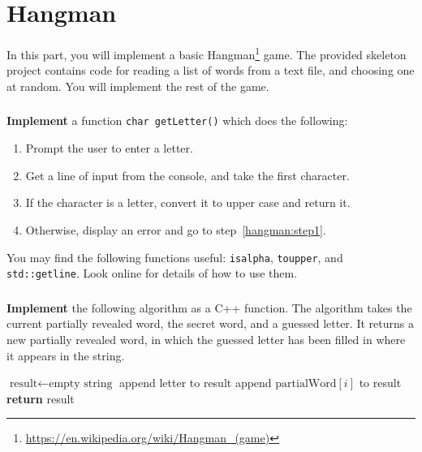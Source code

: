 \documentclass{scrartcl}
\begin{document}
\clearpage
\part{Hangman}

In this part, you will implement a basic Hangman\footnote{\url{https://en.wikipedia.org/wiki/Hangman_(game)}} game.
The provided skeleton project contains code for reading a list of words from a text file, and choosing one at random.
You will implement the rest of the game.

\section{} \label{core-a-first}

\textbf{Implement} a function \lstinline{char getLetter()} which does the following:
\begin{enumerate}
\item \label{hangman:step1} Prompt the user to enter a letter.
\item Get a line of input from the console, and take the first character.
\item If the character is a letter, convert it to upper case and return it.
\item Otherwise, display an error and go to step~\ref{hangman:step1}.
\end{enumerate}

You may find the following functions useful: \lstinline{isalpha}, \lstinline{toupper}, and \lstinline{std::getline}.
Look online for details of how to use them.

\section{}

\textbf{Implement} the following algorithm as a C++ function.
The algorithm takes the current partially revealed word, the secret word, and a guessed letter.
It returns a new partially revealed word, in which the guessed letter has been filled in where it appears in the string.

\begin{algorithm}
\begin{algorithmic}
		\State $\text{result} \gets \text{empty string}$
				\State append letter to result
			\Else
				\State append $\text{partialWord}[i]$ to result
			\EndIf
		\EndFor
		\State \textbf{return} result
	\EndProcedure
\end{algorithmic}
\end{algorithm}
\end{document}
